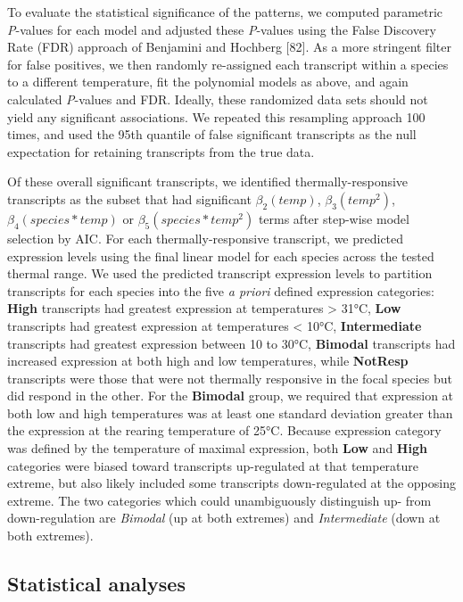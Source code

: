 \documentclass[]{article}
\begin{document}
To evaluate the statistical significance of the patterns, we computed
parametric \emph{P}-values for each model and adjusted these
\emph{P}-values using the False Discovery Rate (FDR) approach of
Benjamini and Hochberg {[}82{]}. As a more stringent filter for false
positives, we then randomly re-assigned each transcript within a species
to a different temperature, fit the polynomial models as above, and
again calculated \emph{P}-values and FDR. Ideally, these randomized data
sets should not yield any significant associations. We repeated this
resampling approach 100 times, and used the 95th quantile of false
significant transcripts as the null expectation for retaining
transcripts from the true data.

Of these overall significant transcripts, we identified
thermally-responsive transcripts as the subset that had significant
\(\beta_2(temp)\), \(\beta_3(temp^2)\), \(\beta_4(species * temp)\) or
\(\beta_5(species * temp^2)\) terms after step-wise model selection by
AIC. For each thermally-responsive transcript, we predicted expression
levels using the final linear model for each species across the tested
thermal range. We used the predicted transcript expression levels to
partition transcripts for each species into the five \emph{a priori}
defined expression categories: \textbf{High} transcripts had greatest
expression at temperatures \textgreater{} 31°C, \textbf{Low} transcripts
had greatest expression at temperatures \textless{} 10°C,
\textbf{Intermediate} transcripts had greatest expression between 10 to
30°C, \textbf{Bimodal} transcripts had increased expression at both high
and low temperatures, while \textbf{NotResp} transcripts were those that
were not thermally responsive in the focal species but did respond in
the other. For the \textbf{Bimodal} group, we required that expression
at both low and high temperatures was at least one standard deviation
greater than the expression at the rearing temperature of 25°C. Because
expression category was defined by the temperature of maximal
expression, both \textbf{Low} and \textbf{High} categories were biased
toward transcripts up-regulated at that temperature extreme, but also
likely included some transcripts down-regulated at the opposing extreme.
The two categories which could unambiguously distinguish up- from
down-regulation are \emph{Bimodal} (up at both extremes) and
\emph{Intermediate} (down at both extremes).

\subsection{Statistical analyses}\label{statistical-analyses}
\end{document}
